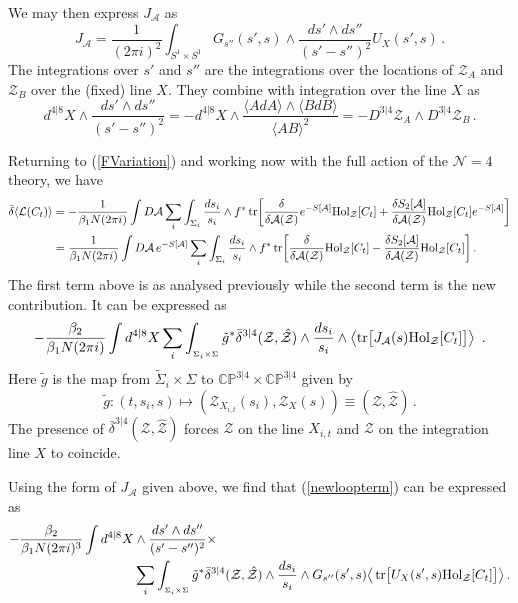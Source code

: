 \documentclass[12pt]{article}
\def \be  {\begin{equation}}
\def \ee  {\end{equation}}
\def \tr {\mathop{\rm tr}\nolimits}
\numberwithin{equation}{section}
\begin{document}
We may then express $J_{\mathcal{A}}$ as
\be
J_{\mathcal{A}} = \frac{1}{(2\pi i)^2} \int_{S^1 \times S^1} G_{s''}(s',s) \wedge \frac{ds' \wedge ds''}{(s'-s'')^2} U_X(s',s) \,.
\ee
The integrations over $s'$ and $s''$ are the integrations over the locations of $\mathcal{Z}_A$ and $\mathcal{Z}_B$ over the (fixed) line $X$. They combine with integration over the line $X$ as
\be
d^{4|8}X \wedge \frac{ds' \wedge ds''}{(s'-s'')^2} = -d^{4|8}X \wedge \frac{\langle A dA \rangle \wedge \langle B d B\rangle}{\langle A B \rangle^2} = -D^{3|4}\mathcal{Z}_A \wedge D^{3|4} \mathcal{Z}_B\,.
\label{lambdaABmeasure}
\ee

Returning to (\ref{FVariation}) and working now with the full action of the $\mathcal{N}=4$ theory, we have
\begin{align}
\bar{\delta} \langle \mathcal{L}(C_t)\rangle &= -\frac{1}{\beta_1 N (2 \pi i)} \int D \mathcal{A}  \sum_i \int_{\Sigma_i} \frac{ds_i}{s_i} \wedge  f^* \tr \biggl[  \frac{\delta}{\delta \mathcal{A}(\mathcal{Z})} e^{-S[\mathcal{A}]} {\rm Hol}_{\mathcal{Z}}[C_t] + \frac{\delta S_2[\mathcal{A}]}{\delta \mathcal{A}(\mathcal{Z})}  {\rm Hol}_{\mathcal{Z}}[C_t] e^{-S[\mathcal{A}]}\biggr] \notag \\
&=\frac{1}{\beta_1 N (2 \pi i)}\int D \mathcal{A}\, e^{-S[\mathcal{A}]} \sum_i \int_{\Sigma_i} \frac{ds_i}{s_i} \wedge  f^* \tr \biggl[  \frac{\delta}{\delta \mathcal{A}(\mathcal{Z})} {\rm Hol}_{\mathcal{Z}}[C_t] - \frac{\delta S_2[\mathcal{A}]}{\delta \mathcal{A}(\mathcal{Z})}  {\rm Hol}_{\mathcal{Z}}[C_t] \biggr]\,.
\end{align}
The first term above is as analysed previously while the second term is the new contribution. It can be expressed as
\be
-\frac{\beta_2}{\beta_1 N (2 \pi i)} \int d^{4|8}X \sum_i \int_{{}_{\Sigma_i \times \Sigma}} \tilde{g}^* \bar{\delta}^{3|4}(\mathcal{Z},\hat{\mathcal{Z}}) \wedge \frac{ds_i}{s_i} \wedge 
\big\langle \! \tr \bigl[ J_{\mathcal{A}}(s) {\rm Hol}_{\mathcal{Z}}[C_t] \bigr] \big\rangle\ 
\,.
\label{newloopterm}
\ee
Here $\tilde{g}$ is the map from $\tilde{\Sigma}_i \times \Sigma$ to $\mathbb{CP}^{3|4} \times \mathbb{CP}^{3|4}$ given by
\be
\tilde{g}: (t,s_i,s) \mapsto (\mathcal{Z}_{X_{i,t}}(s_i) , \mathcal{Z}_X(s)) \equiv (\mathcal{Z},\hat{\mathcal{Z}})\,.
\ee
The presence of $\bar{\delta}^{3|4}(\mathcal{Z},\hat{\mathcal{Z}})$ forces $\mathcal{Z}$ on the line $X_{i,t}$ and $\hat{\mathcal{Z}}$ on the integration line $X$ to coincide. 

Using the form of $J_{\mathcal{A}}$ given above, we find that (\ref{newloopterm}) can be expressed as
\begin{align}
\label{newloopterm2}
-\frac{\beta_2}{\beta_1 N (2 \pi i)^3} \int d^{4|8}X & \wedge \frac{ds' \wedge ds''}{(s'-s'')^2} \times \\
&\sum_i \int_{{}_{\Sigma_i \times \Sigma}}  \tilde{g}^* \bar{\delta}^{3|4}(\mathcal{Z},\hat{\mathcal{Z}}) \wedge \frac{ds_i}{s_i} \wedge G_{s''}(s',s)   
\big\langle \tr \bigl[U_X(s',s) {\rm Hol}_{\mathcal{Z}}[C_t]\bigr] \big\rangle 
\,. \notag
\end{align}
\end{document}
